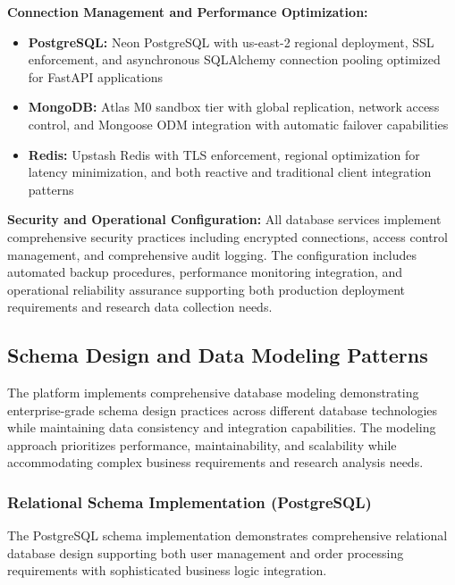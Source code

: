 \textbf{Connection Management and Performance Optimization:}
\begin{itemize}
\item \textbf{PostgreSQL:} Neon PostgreSQL with us-east-2 regional deployment, SSL enforcement, and asynchronous SQLAlchemy connection pooling optimized for FastAPI applications
\item \textbf{MongoDB:} Atlas M0 sandbox tier with global replication, network access control, and Mongoose ODM integration with automatic failover capabilities
\item \textbf{Redis:} Upstash Redis with TLS enforcement, regional optimization for latency minimization, and both reactive and traditional client integration patterns
\end{itemize}

\textbf{Security and Operational Configuration:}
All database services implement comprehensive security practices including encrypted connections, access control management, and comprehensive audit logging. The configuration includes automated backup procedures, performance monitoring integration, and operational reliability assurance supporting both production deployment requirements and research data collection needs.

\subsection{Schema Design and Data Modeling Patterns}

The platform implements comprehensive database modeling demonstrating enterprise-grade schema design practices across different database technologies while maintaining data consistency and integration capabilities. The modeling approach prioritizes performance, maintainability, and scalability while accommodating complex business requirements and research analysis needs.

\subsubsection{Relational Schema Implementation (PostgreSQL)}

The PostgreSQL schema implementation demonstrates comprehensive relational database design supporting both user management and order processing requirements with sophisticated business logic integration.

